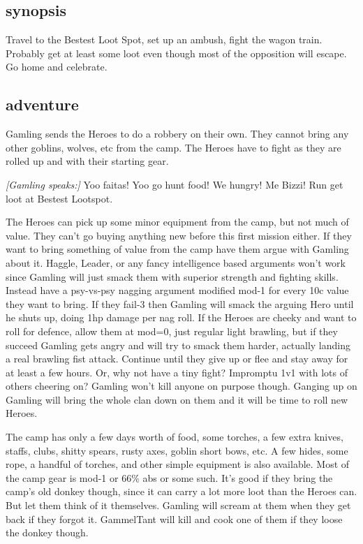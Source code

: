 \subsection*{synopsis}

Travel to the Bestest Loot Spot, set up an ambush, fight the wagon train. Probably get at least some loot even though most of the opposition will escape. Go home and celebrate.


\subsection*{adventure}

Gamling sends the Heroes to do a robbery on their own. They cannot bring any other goblins, wolves, etc from the camp. The Heroes have to fight as they are rolled up and with their starting gear.

\begin{readoutloud}
\emph{[Gamling speaks:]}
Yoo faitas! Yoo go hunt food! We hungry! Me Bizzi! Run get loot at Bestest Lootspot.
\end{readoutloud}

\noindent The Heroes can pick up some minor equipment from the camp, but not much of value. They can't go buying anything new before this first mission either. If they want to bring something of value from the camp have them argue with Gamling about it. Haggle, Leader, or any fancy intelligence based arguments won't work since Gamling will just smack them with superior strength and fighting skills. Instead have a psy-vs-psy nagging argument modified mod-1 for every 10c value they want to bring. If they fail-3 then Gamling will smack the arguing Hero until he shuts up, doing 1hp damage per nag roll. If the Heroes are cheeky and want to roll for defence, allow them at mod=0, just regular light brawling, but if they succeed Gamling gets angry and will try to smack them harder, actually landing a real brawling fist attack. Continue until they give up or flee and stay away for at least a few hours. Or, why not have a tiny fight? Impromptu 1v1 with lots of others cheering on? Gamling won't kill anyone on purpose though. Ganging up on Gamling will bring the whole clan down on them and it will be time to roll new Heroes.

The camp has only a few days worth of food, some torches, a few extra knives, staffs, clubs, shitty spears, rusty axes, goblin short bows, etc. A few hides, some rope, a handful of torches, and other simple equipment is also available. Most of the camp gear is mod-1 or 66\% abs or some such. It's good if they bring the camp's old donkey though, since it can carry a lot more loot than the Heroes can. But let them think of it themselves. Gamling will scream at them when they get back if they forgot it. GammelTant will kill and cook one of them if they loose the donkey though.

